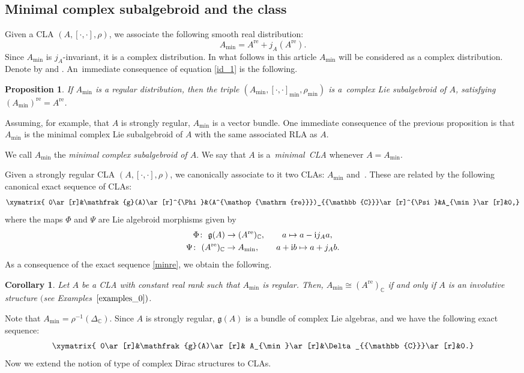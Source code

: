 \documentclass[pdftex]{sigma}
\numberwithin{equation}{section}
\newtheorem{Corollary}[Theorem]{Corollary}
\newtheorem{Proposition}[Theorem]{Proposition}
 { \theoremstyle{definition}
\newtheorem{Definition}[Theorem]{Definition}
\newtheorem{Note}[Theorem]{Note}
\newtheorem{Example}[Theorem]{Example}
\newtheorem{Examples}[Theorem]{Examples}
\newtheorem{Remark}[Theorem]{Remark} }
\newcommand{\C}{{\mathbb{C}}}
\newcommand{\g}{\mathfrak{g}}
\DeclareMathOperator{\real}{re}
\begin{document}
\subsection{Minimal complex subalgebroid and the class}%
Given a CLA $(A,[\cdot,\cdot],\rho)$, we associate the following smooth real distribution:
\[A_{\min}=A^{\real}+j_A(A^{\real}).\]
Since $A_{\min}$ is $j_A$-invariant, it is a complex distribution. In what follows in this article $A_{\min}$ will be considered as a complex distribution.
 Denote by  and . An~immediate consequence of equation \eqref{id_1} is the following.
 \begin{Proposition}
If $A_{\min}$ is a regular distribution, then the triple $(A_{\min}, [\cdot,\cdot]_{\min}, \rho_{\min})$ is a~complex Lie subalgebroid of $A$, satisfying $(A_{\min})^{\real}=A^{\real}$.
 \end{Proposition}
Assuming, for example, that $A$ is strongly regular, $A_{\min}$ is a vector bundle. One immediate consequence of the previous proposition is that $A_{\min}$ is the minimal complex Lie subalgebroid of $A$ with the same associated RLA as $A$.
\begin{Definition}
We call $A_{\min}$ the {\em minimal complex subalgebroid of $A$}. We say that $A$ is a~{\em minimal~CLA} whenever $A=A_{\min}$.
\end{Definition}
Given a strongly regular CLA $(A,[\cdot,\cdot],\rho)$, we canonically associate to it two CLAs: $A_{\min}$ and~\smash{$(A^{\real})_{\C}$}. These are related by the following canonical exact sequence of CLAs:
\begin{equation}\label{minre}
\xymatrix{
0\ar[r]&\g(A)\ar[r]^{\Phi}&(A^{\real})_{\C}\ar[r]^{\Psi}&A_{\min}\ar[r]&0,}
\end{equation}
where the maps $\Phi$ and $\Psi$ are Lie algebroid morphisms given by
\begin{gather*}%
\Phi\colon \ \g(A)\to (A^{\real})_{\C}, \qquad a\mapsto a-{\rm i}j_A a,\\
\Psi\colon \ (A^{\real})_{\C}\to A_{\min}, \qquad a+{\rm i}b\mapsto a+j_A b.\nonumber
\end{gather*}
As a consequence of the exact sequence \eqref{minre}, we obtain the following.
\begin{Corollary}
   Let $A$ be a CLA with constant real rank such that $A_{\min}$ is regular. Then, $A_{\min}\cong (A^{\real})_{\C}$ if and only if $A$ is an involutive structure $($see Examples~$\ref{examples_0})$.
\end{Corollary}
Note that $A_{\min}=\rho^{-1}(\Delta_{\C})$. Since $A$ is strongly regular, $\g(A)$ is a bundle of complex Lie algebras, and we have the following exact sequence:
\[
\xymatrix{
0\ar[r]&\g(A)\ar[r]& A_{\min}\ar[r]&\Delta_{\C}\ar[r]&0.}
\]
Now we extend the notion of type of complex Dirac structures \cite[Definition 4.7]{aguero2022complex} to CLAs.
\end{document}
